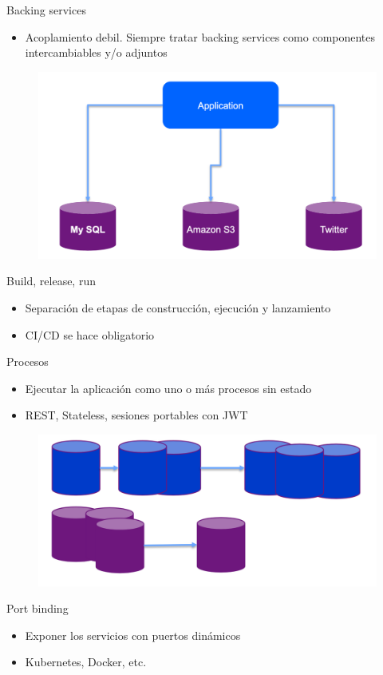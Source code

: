 \documentclass[aspectratio=169]{beamer}
\begin{document}
\begin{frame}{Backing services}
\begin{itemize}
	\item Acoplamiento debil. Siempre tratar backing services como componentes intercambiables y/o adjuntos
\end{itemize}

\begin{figure}
	\centering
	\includegraphics[width=0.5\linewidth]{Images/backing}
\end{figure}
\end{frame}

\begin{frame}{Build, release, run}
\begin{itemize}
	\item Separación de etapas de construcción, ejecución y lanzamiento
	\item CI/CD se hace obligatorio
\end{itemize}
\end{frame}

\begin{frame}{Procesos}
\begin{itemize}
	\item Ejecutar la aplicación como uno o más procesos sin estado
	\item REST, Stateless, sesiones portables con JWT
\end{itemize}
\begin{figure}
	\centering
	\includegraphics[width=0.5\linewidth]{Images/services}
\end{figure}
\end{frame}


\begin{frame}{Port binding}
\begin{itemize}
	\item Exponer los servicios con puertos dinámicos
	\item Kubernetes, Docker, etc.
\end{itemize}
\end{frame}
\end{document}
